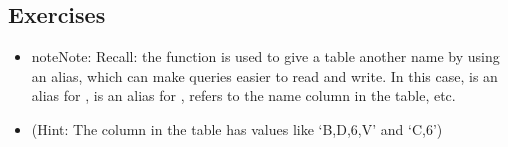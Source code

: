 \documentclass[a4paper,11pt,english]{sphinxmanual}
\begin{document}
\subsection{Exercises}
\label{\detokenize{basic:id18}}\begin{itemize}
\item {} 

\begin{sphinxVerbatim}[commandchars=\\\{\}]
  
   
   
  
   
\end{sphinxVerbatim}

\begin{sphinxadmonition}{note}{Note:}
Recall: the function  is used to give a table another name by using an alias, which can make queries easier to read and write. In this case,  is an alias for ,  is an alias for ,  refers to the name column in the  table, etc.
\end{sphinxadmonition}

\begin{sphinxVerbatim}[commandchars=\\\{\}]
        
    
\end{sphinxVerbatim}

\item {} 
 (Hint: The  column in the  table has values like ‘B,D,6,V’ and ‘C,6’)


\end{itemize}
\end{document}
